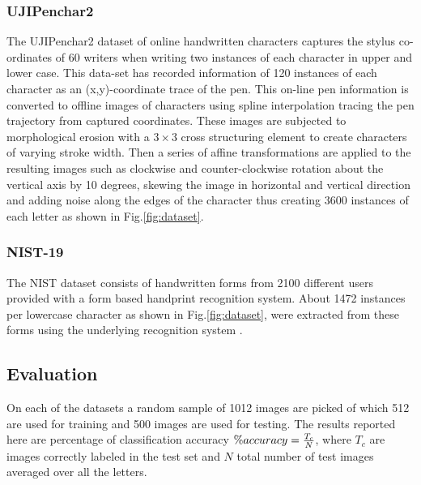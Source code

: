 \documentclass[runningheads]{llncs}
\begin{document}
\subsubsection{UJIPenchar2}
The UJIPenchar2 dataset of online handwritten characters \cite{UJIPen} captures the stylus co-ordinates of 60 writers when writing two instances of each character in upper and lower case. This data-set has recorded information of 120 instances of each character as an (x,y)-coordinate trace of the pen. This on-line pen information is converted to offline images of characters using spline interpolation tracing the pen trajectory from captured coordinates. These images are subjected to  morphological erosion with a $3\times3$ cross structuring element to create characters of varying stroke width. Then a series of affine transformations are applied to the resulting images such as clockwise and counter-clockwise rotation about the vertical axis by 10 degrees, skewing the image in horizontal and vertical direction and adding noise along the edges of the character thus creating 3600 instances of each letter as shown in Fig.\ref{fig:dataset}.

\subsubsection{NIST-19}
The NIST dataset consists of handwritten forms from 2100 different users provided with a form based handprint recognition system. About 1472 instances per lowercase character as shown in Fig.\ref{fig:dataset}, were extracted from these forms using the underlying recognition system \cite{NIST19}.

\subsection{Evaluation}
On each of the datasets a random sample of 1012 images are picked of which 512 are used for training and 500 images are used for testing. The results reported here are percentage of classification accuracy $\% accuracy = \frac{T_c}{N} \time 100$, where $T_c$ are images correctly labeled in the test set and $N$ total number of test images averaged over all the letters. 
\end{document}

